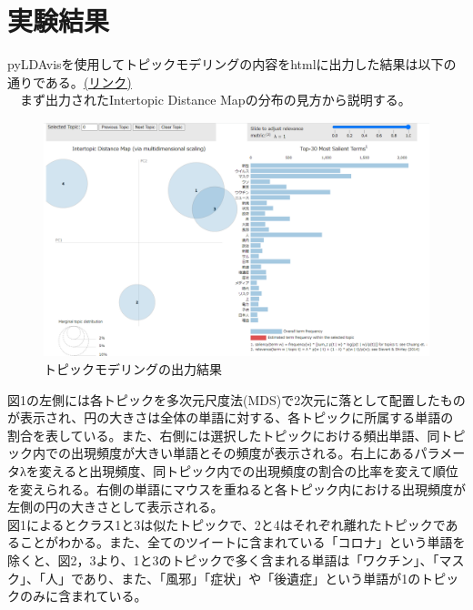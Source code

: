 \documentclass[a4paper, 11pt, titlepage]{jsarticle}
\begin{document}
\section{実験結果}
pyLDAvisを使用してトピックモデリングの内容をhtmlに出力した結果は以下の通りである。\href{https://ie.u-ryukyu.ac.jp/~e205759/pyldavis_output.html}{(リンク)}\\
　まず出力されたIntertopic Distance Mapの分布の見方から説明する。\\
\begin{figure}[H]
  \centering 
  \includegraphics[scale=0.25]{picture1.png}
  \caption{トピックモデリングの出力結果}
\end{figure}
図1の左側には各トピックを多次元尺度法(MDS)で2次元に落として配置したものが表示され、円の大きさは全体の単語に対する、各トピックに所属する単語の割合を表している。また、右側には選択したトピックにおける頻出単語、同トピック内での出現頻度が大きい単語とその頻度が表示される。右上にあるパラメータλを変えると出現頻度、同トピック内での出現頻度の割合の比率を変えて順位を変えられる。右側の単語にマウスを重ねると各トピック内における出現頻度が左側の円の大きさとして表示される。\\
\newpage
図1によるとクラス1と3は似たトピックで、2と4はそれぞれ離れたトピックであることがわかる。また、全てのツイートに含まれている「コロナ」という単語を除くと、図2，3より、1と3のトピックで多く含まれる単語は「ワクチン」、「マスク」、「人」であり、また、「風邪」「症状」や「後遺症」という単語が1のトピックのみに含まれている。\\
\end{document}
